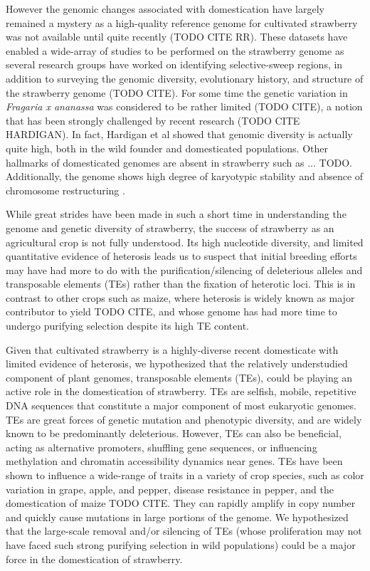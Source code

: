 \documentclass[fleqn,10pt]{olplainarticle}
\begin{document}
However the genomic changes associated with domestication have largely remained a mystery as a high-quality reference genome for cultivated strawberry was not available until quite recently \cite{Edger2019} (TODO CITE RR).
These datasets have enabled a wide-array of studies to be performed on the strawberry genome as several research groups have worked on identifying selective-sweep regions, in addition to surveying the genomic diversity, evolutionary history, and structure of the strawberry genome (TODO CITE).
For some time the genetic variation in \textit{Fragaria x ananassa} was considered to be rather limited (TODO CITE), a notion that has been strongly challenged by recent research (TODO CITE HARDIGAN).
In fact, Hardigan et al showed that genomic diversity is actually quite high, both in the wild founder and domesticated populations.
Other hallmarks of domesticated genomes are absent in strawberry such as ... TODO.
Additionally, the genome shows high degree of karyotypic stability and absence of chromosome restructuring \cite{Hardigan2020, Hardigan2021}.


While great strides have been made in such a short time in understanding the genome and genetic diversity of strawberry, the success of strawberry as an agricultural crop is not fully understood.
Its high nucleotide diversity, and limited quantitative evidence of heterosis \cite{Stegmeir2010, Rho2012, Hardigan2020} leads us to suspect that initial breeding efforts may have had more to do with the purification/silencing of deleterious alleles and transposable elements (TEs) rather than the fixation of heterotic loci.
This is in contrast to other crops such as maize, where heterosis is widely known as major contributor to yield TODO CITE, and whose genome has had more time to undergo purifying selection despite its high TE content.


Given that cultivated strawberry is a highly-diverse recent domesticate with limited evidence of heterosis, we hypothesized that the relatively understudied component of plant genomes, transposable elements (TEs), could be playing an active role in the domestication of strawberry.
TEs are selfish, mobile, repetitive DNA sequences that constitute a major component of most eukaryotic genomes.
TEs are great forces of genetic mutation and phenotypic diversity, and are widely known to be predominantly deleterious.
However, TEs can also be beneficial, acting as alternative promoters, shuffling gene sequences, or influencing methylation and chromatin accessibility dynamics near genes.
TEs have been shown to influence a wide-range of traits in a variety of crop species, such as color variation in grape, apple, and pepper, disease resistance in pepper, and the domestication of maize TODO CITE.
They can rapidly amplify in copy number and quickly cause mutations in large portions of the genome.
We hypothesized that the large-scale removal and/or silencing of TEs (whose proliferation may not have faced such strong purifying selection in wild populations) could be a major force in the domestication of strawberry.
\end{document}
